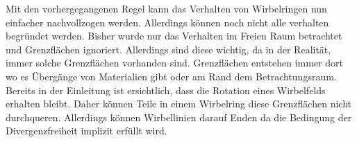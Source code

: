 Mit den vorhergegangenen Regel kann das Verhalten von Wirbelringen nun einfacher nachvollzogen werden. 
Allerdings können noch nicht alle verhalten begründet werden. 
Bisher wurde nur das Verhalten im Freien Raum betrachtet und Grenzflächen ignoriert. 
Allerdings sind diese wichtig, da in der Realität, immer solche Grenzflächen vorhanden sind. 
Grenzflächen entstehen immer dort wo es Übergänge von Materialien gibt oder am Rand dem Betrachtungsraum.
Bereits in der Einleitung ist ersichtlich, dass die Rotation eines Wirbelfelds erhalten bleibt. 
Daher können Teile in einem Wirbelring diese Grenzflächen nicht durchqueren. 
Allerdings können Wirbellinien darauf Enden da die Bedingung der Divergenzfreiheit implizit erfüllt wird. 
